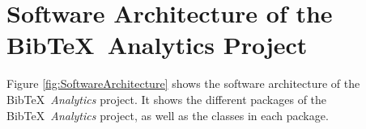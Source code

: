 









\chapter{Software Architecture of the {\sc Bib}\TeX\ Analytics Project}
\label{chp:SoftwareArchitectureOfTheBibTeXAnalyticsProject}


Figure \ref{fig:SoftwareArchitecture} shows the software architecture of the {\sc Bib}\TeX\ {\it Analytics} project. It shows the different packages of the {\sc Bib}\TeX\ {\it Analytics} project, as well as the classes in each package. \\

